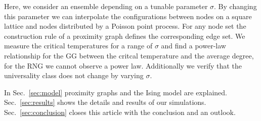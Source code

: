 Here, we consider an ensemble depending on a tunable parameter $\sigma$.
By changing this parameter we can interpolate the configurations
between nodes on a square lattice and nodes distributed by a Poisson point process.
For any node set the construction rule of a proximity
graph defines the corresponding edge set.
We measure the critical temperatures for a range of $\sigma$ and find
a power-law relationship for the GG between the critcal temperature and
the average degree, for the RNG we cannot observe a power law.
Additionally we verify that the universality class does not change by
varying $\sigma$.

In Sec.~\ref{sec:model} proximity graphs and the Ising model
are explained. Sec.~\ref{sec:results} shows the
details and results of our simulations. Sec.~\ref{sec:conclusion}
closes this article with the conclusion and an outlook.
